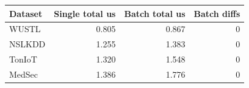 \begin{tabular}{lrrr}
\toprule
Dataset & Single total us & Batch total us & Batch diffs \\
\midrule
WUSTL & 0.805 & 0.867 & 0 \\
NSLKDD & 1.255 & 1.383 & 0 \\
TonIoT & 1.320 & 1.548 & 0 \\
MedSec & 1.386 & 1.776 & 0 \\
\bottomrule
\end{tabular}
